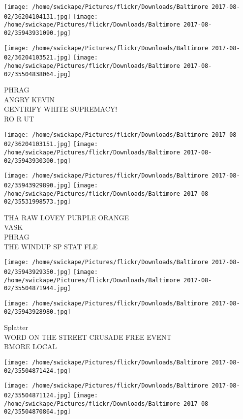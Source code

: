 \documentclass[10pt,letterpaper]{article}
\begin{document}
\texttt{[image: /home/swickape/Pictures/flickr/Downloads/Baltimore 2017-08-02/36204104131.jpg]}
\texttt{[image: /home/swickape/Pictures/flickr/Downloads/Baltimore 2017-08-02/35943931090.jpg]}

\texttt{[image: /home/swickape/Pictures/flickr/Downloads/Baltimore 2017-08-02/36204103521.jpg]}
\texttt{[image: /home/swickape/Pictures/flickr/Downloads/Baltimore 2017-08-02/35504838064.jpg]}

PHRAG\\
ANGRY KEVIN\\
GENTRIFY WHITE SUPREMACY!\\
RO R UT
\pagebreak

\texttt{[image: /home/swickape/Pictures/flickr/Downloads/Baltimore 2017-08-02/36204103151.jpg]}
\texttt{[image: /home/swickape/Pictures/flickr/Downloads/Baltimore 2017-08-02/35943930300.jpg]}

\texttt{[image: /home/swickape/Pictures/flickr/Downloads/Baltimore 2017-08-02/35943929890.jpg]}
\texttt{[image: /home/swickape/Pictures/flickr/Downloads/Baltimore 2017-08-02/35531998573.jpg]}

THA RAW LOVEY PURPLE ORANGE\\
VASK\\
PHRAG\\
THE WINDUP SP STAT FLE
\pagebreak

\texttt{[image: /home/swickape/Pictures/flickr/Downloads/Baltimore 2017-08-02/35943929350.jpg]}
\texttt{[image: /home/swickape/Pictures/flickr/Downloads/Baltimore 2017-08-02/35504871944.jpg]}

\texttt{[image: /home/swickape/Pictures/flickr/Downloads/Baltimore 2017-08-02/35943928980.jpg]}

Splatter\\
WORD ON THE STREET CRUSADE FREE EVENT\\
BMORE LOCAL
\pagebreak

\texttt{[image: /home/swickape/Pictures/flickr/Downloads/Baltimore 2017-08-02/35504871424.jpg]}

\vspace{0.25in}
\texttt{[image: /home/swickape/Pictures/flickr/Downloads/Baltimore 2017-08-02/35504871124.jpg]}
\texttt{[image: /home/swickape/Pictures/flickr/Downloads/Baltimore 2017-08-02/35504870864.jpg]}
\end{document}
